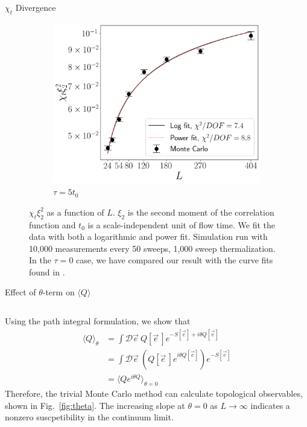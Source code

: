 \documentclass[18pt]{beamer}
\newcommand{\e}{\vec e}
\begin{document}
\begin{frame}{}
\begin{columns}[t]
\begin{column}{0.32\linewidth}
\begin{block}{$\chi_t$ Divergence}
\begin{figure}[h!]
\begin{center}
\begin{subfigure}[b]{0.45\textwidth}
                  \includegraphics[height=0.7\textwidth]{divergence_flowed.png}
                  \caption{$\tau = 5t_0$}
              \end{subfigure}
            \end{center}
              \caption{\label{fig:divergence} $\chi_t\xi_2^2$ as a function of $L$. $\xi_2$ is the second moment of the correlation function and $t_0$ is a scale-independent unit of flow time. We fit the data with both a logarithmic and power fit. Simulation run with 10,000 measurements every 50 sweeps, 1,000 sweep thermalization. In the $\tau=0$ case, we have compared our result with the curve fits found in \cite{bietenholz2018}.}
        \end{figure}
    \end{block}

    \begin{block}{Effect of $\theta$-term on $\langle Q \rangle$}
        \begin{columns}
            \begin{column}{0.35\textwidth}
                Using the path integral formulation, we show that
                \begin{align*}
                    \langle Q \rangle_\theta &=\int \mathcal{D}\e\:Q[\e\,]e^{-S[\e]+i\theta Q[\e]} \\
                                             &=\int \mathcal{D}\e\:\left( Q[\e\,]e^{i\theta Q[\e]} \right) e^{-S[\e]} \\
                                             &=\langle Q e^{i \theta Q} \rangle_{\theta=0}
                \end{align*}
                Therefore, the trivial Monte Carlo method can calculate topological observables, shown in Fig.~\ref{fig:theta}. The increasing slope at $\theta=0$ as $L\rightarrow\infty$ indicates a nonzero suscpetibility in the continuum limit.
            \end{column}


\end{columns}
\end{block}
\end{column}
\end{columns}
\end{frame}
\end{document}
